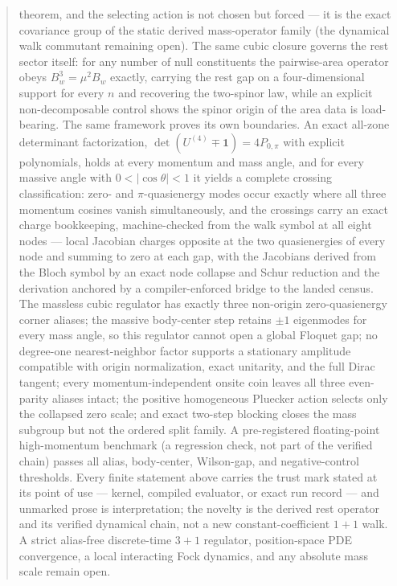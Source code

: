 \documentclass[11pt]{article}
\newcommand{\id}{\mathbf{1}}
\begin{document}
\begin{abstract}
theorem, and the selecting action is not chosen but forced --- it is the
exact covariance group of the static derived mass-operator family
(the dynamical walk commutant remaining open).  The same cubic closure governs the rest sector itself:
for any number of null constituents the pairwise-area operator obeys
$B_w^3=\mu^2B_w$ exactly, carrying the rest gap on a four-dimensional
support for every $n$ and recovering the two-spinor law, while an
explicit non-decomposable control shows the spinor origin of the area
data is load-bearing.  The
same framework proves its own boundaries.  An exact all-zone determinant
factorization, $\det(U^{(4)}\mp\id)=4P_{0,\pi}$ with explicit polynomials,
holds at every momentum and mass angle, and for every massive angle with
$0<|\cos\theta|<1$ it yields a complete crossing classification: zero- and
$\pi$-quasienergy modes occur exactly where all three momentum cosines
vanish simultaneously, and the crossings carry an exact charge
bookkeeping, machine-checked from the walk symbol at all eight nodes ---
local Jacobian charges opposite at the two quasienergies
of every node and summing to zero at each gap, with the Jacobians
derived from the Bloch symbol by an exact node collapse and Schur
reduction and the derivation anchored by a compiler-enforced bridge to
the landed census.  The massless cubic regulator has
exactly three non-origin zero-quasienergy corner aliases; the massive
body-center step retains $\pm1$ eigenmodes for every mass angle, so this
regulator cannot open a global Floquet gap; no degree-one nearest-neighbor
factor supports a stationary amplitude compatible with origin normalization,
exact unitarity, and the full Dirac tangent; every momentum-independent onsite
coin leaves all three even-parity aliases intact; the positive homogeneous
Pluecker action selects only the collapsed zero scale; and exact two-step
blocking closes the mass subgroup but not the ordered split family.  A
pre-registered floating-point high-momentum benchmark (a regression check,
not part of the verified chain) passes all alias, body-center,
Wilson-gap, and negative-control thresholds.  Every finite statement above
carries the trust mark stated at its point of use --- kernel, compiled
evaluator, or exact run record --- and unmarked prose is interpretation;
the novelty is the derived rest operator and its verified
dynamical chain, not a new constant-coefficient $1+1$ walk.  A strict
alias-free discrete-time $3+1$ regulator, position-space PDE convergence, a
local interacting Fock dynamics, and any absolute mass scale remain open.
\end{abstract}
\end{document}
